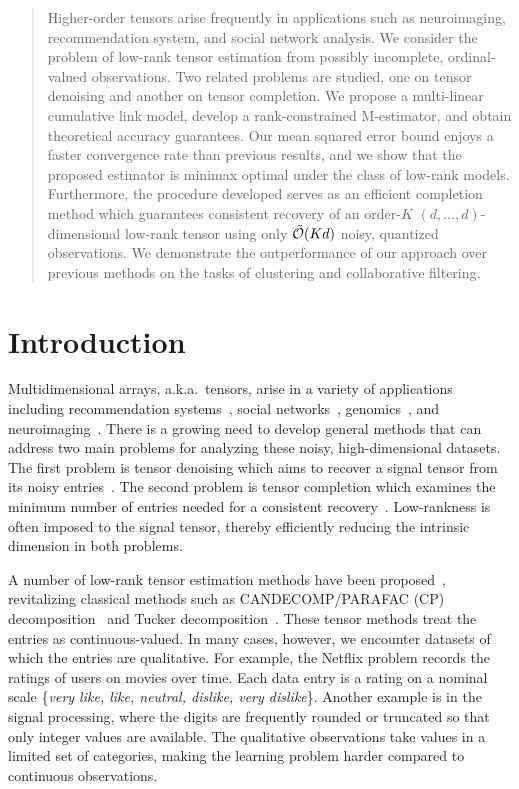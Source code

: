 \documentclass{article}
\theoremstyle{plain}
\theoremstyle{definition}
\begin{document}
\begin{abstract}
Higher-order tensors arise frequently in applications such as neuroimaging, recommendation system, and social network analysis. We consider the problem of low-rank tensor estimation from possibly incomplete, ordinal-valued observations. Two related problems are studied, one on tensor denoising and another on tensor completion. We propose a multi-linear cumulative link model, develop a rank-constrained M-estimator, and obtain theoretical accuracy guarantees. Our mean squared error bound enjoys a faster convergence rate than previous results, and we show that the proposed estimator is minimax optimal under the class of low-rank models. Furthermore, the procedure developed serves as an efficient completion method which guarantees consistent recovery of an order-$K$ $(d,\ldots,d)$-dimensional low-rank tensor using only $\tilde {\mathcal{O}}(Kd)$ noisy, quantized observations. We demonstrate the outperformance of our approach over previous methods on the tasks of clustering and collaborative filtering.

\end{abstract}


\section{Introduction}
Multidimensional arrays, a.k.a.\ tensors, arise in a variety of applications including recommendation systems~\citep{baltrunas2011incarmusic}, social networks~\citep{nickel2011three}, genomics~\citep{wang2019three}, and neuroimaging~\citep{zhou2013tensor}. There is a growing need to develop general methods that can address two main problems for analyzing these noisy, high-dimensional datasets. The first problem is tensor denoising which aims to recover a signal tensor from its noisy entries~\citep{hong2018generalized,wang2019multiway}. The second problem is tensor completion which examines the minimum number of entries needed for a consistent recovery~\citep{ghadermarzy2018learning,montanari2018spectral}. Low-rankness is often imposed to the signal tensor, thereby efficiently reducing the intrinsic dimension in both problems.

A number of low-rank tensor estimation methods have been proposed~\citep{hong2018generalized,wang2017tensor}, revitalizing classical methods such as CANDECOMP/PARAFAC (CP) decomposition~\citep{hitchcock1927expression} and Tucker decomposition~\citep{tucker1966some}. These tensor methods treat the entries as continuous-valued. In many cases, however, we encounter datasets of which the entries are qualitative. For example, the Netflix problem records the ratings of users on movies over time. Each data entry is a rating on a nominal scale \{{\it very like, like, neutral, dislike, very dislike}\}. Another example is in the signal processing, where the digits are frequently rounded or truncated so that only integer values are available. The qualitative observations take values in a limited set of categories, making the learning problem harder compared to  continuous observations.
\end{document}

